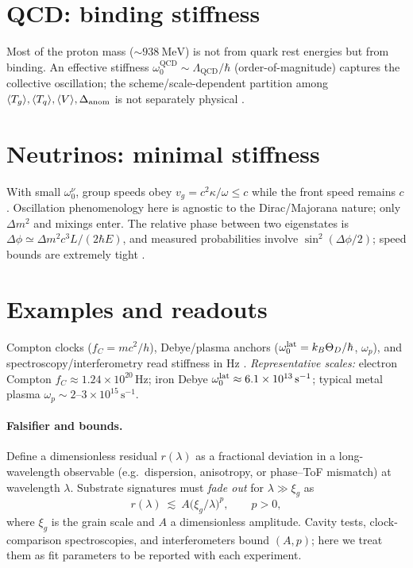 
\section*{QCD: binding stiffness}
Most of the proton mass (\(\sim 938~\mathrm{MeV}\)) is not from quark rest energies but from binding. An effective stiffness \(\omega_0^{\mathrm{QCD}}\sim\Lambda_{\mathrm{QCD}}/\hbar\) (order-of-magnitude) captures the collective oscillation; the scheme/scale-dependent partition among \(\langle T_g\rangle,\langle T_q\rangle,\langle V\rangle,\Delta_{\rm anom}\) is not separately physical \cite{krane1988introductory}.

\section*{Neutrinos: minimal stiffness}
With small \(\omega_0^\nu\), group speeds obey \(v_g=c^2\kappa/\omega\le c\) while the front speed remains \(c\).
Oscillation phenomenology here is agnostic to the Dirac/Majorana nature; only \(\Delta m^2\) and mixings enter.
The relative phase between two eigenstates is
\(
\Delta\phi \simeq \Delta m^2 c^3 L/(2\hbar E)
\),
and measured probabilities involve \(\sin^2(\Delta\phi/2)\); speed bounds are extremely tight \cite{griffiths2018quantum}.

\section*{Examples and readouts}
Compton clocks (\(f_C=mc^2/h\)), Debye/plasma anchors (\(\omega_0^{\rm lat}=k_B\Theta_D/\hbar\), \(\omega_p\)), and spectroscopy/interferometry read stiffness in Hz \cite{bipm2019si,callen1985thermodynamics,jackson1999classical}.
\textit{Representative scales:} electron Compton \(f_C \approx 1.24\times 10^{20}\,\mathrm{Hz}\);
iron Debye \(\omega_0^{\rm lat}\approx 6.1\times 10^{13}\,\mathrm{s^{-1}}\);
typical metal plasma \(\omega_p\sim 2\text{--}3\times 10^{15}\,\mathrm{s^{-1}}\).

\paragraph{Falsifier and bounds.}
Define a dimensionless residual \(r(\lambda)\) as a fractional deviation in a long-wavelength observable (e.g.\ dispersion, anisotropy, or phase--ToF mismatch) at wavelength \(\lambda\).
Substrate signatures must \emph{fade out} for \(\lambda\gg \xi_g\) as
\[
r(\lambda)\ \lesssim\ A\big(\xi_g/\lambda\big)^{p},\qquad p>0,
\]
where \(\xi_g\) is the grain scale and \(A\) a dimensionless amplitude.
Cavity tests, clock-comparison spectroscopies, and interferometers bound \((A,p)\); here we treat them as fit parameters to be reported with each experiment.


